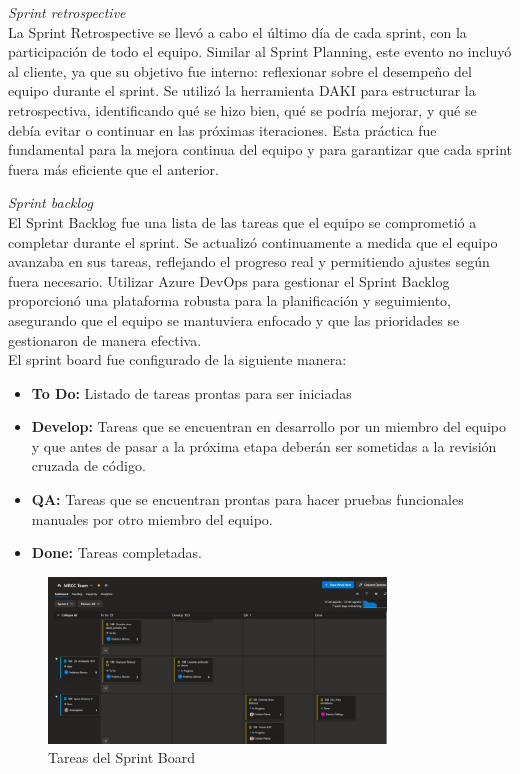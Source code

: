 \textit{Sprint retrospective}\\
La Sprint Retrospective se llevó a cabo el último día de cada sprint, con la participación de todo el equipo. Similar al Sprint Planning, este evento no incluyó al cliente, ya que su objetivo fue 
interno: reflexionar sobre el desempeño del equipo durante el sprint. Se utilizó la herramienta DAKI para estructurar la retrospectiva, identificando qué se hizo bien, qué se podría mejorar, y qué 
se debía evitar o continuar en las próximas iteraciones. Esta práctica fue fundamental para la mejora continua del equipo y para garantizar que cada sprint fuera más eficiente que el anterior.

\textit{Sprint backlog}\\
El Sprint Backlog fue una lista de las tareas que el equipo se comprometió a completar durante el sprint. Se actualizó continuamente a medida que el equipo avanzaba en sus tareas, reflejando el 
progreso real y permitiendo ajustes según fuera necesario. Utilizar Azure DevOps para gestionar el Sprint Backlog proporcionó una plataforma robusta para la planificación y seguimiento, asegurando 
que el equipo se mantuviera enfocado y que las prioridades se gestionaron de manera efectiva.\\
El sprint board fue configurado de la siguiente manera:\\


\begin{itemize}
    \item \textbf{To Do:} Listado de tareas prontas para ser iniciadas
    \item \textbf{Develop:} Tareas que se encuentran en desarrollo por un miembro del equipo y que antes de pasar a la próxima etapa deberán ser sometidas a la revisión cruzada de código.
    \item \textbf{QA:} Tareas que se encuentran prontas para hacer pruebas funcionales manuales por otro miembro del equipo.
    \item \textbf{Done:} Tareas completadas.
\end{itemize}

\begin{figure}[H]
    \centering
    \includegraphics[width=0.8\textwidth]{../imagenes/secciones/3-marco-metodologico/Sprint Board.jpg}
    \caption{Tareas del Sprint Board}
    \label{fig:sprintBoard}
\end{figure}

